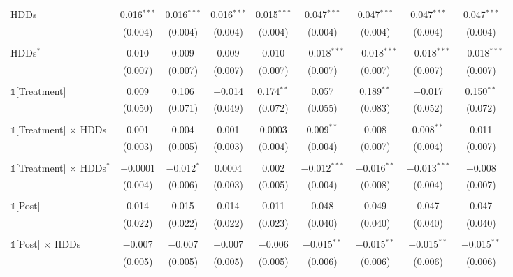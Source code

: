 \begin{table}[t!]
\begin{ThreePartTable}
\begin{landscape}
\begin{longtable}{@{\extracolsep{1.5pt}}lcccccccc}
                HDDs & 0.016$^{***}$ & 0.016$^{***}$ & 0.016$^{***}$ & 0.015$^{***}$ & 0.047$^{***}$ & 0.047$^{***}$ & 0.047$^{***}$ & 0.047$^{***}$ \\
                & (0.004) & (0.004) & (0.004) & (0.004) & (0.004) & (0.004) & (0.004) & (0.004) \\
                & & & & & & & & \\
                HDDs$^{*}$ & 0.010 & 0.009 & 0.009 & 0.010 & $-$0.018$^{***}$ & $-$0.018$^{***}$ & $-$0.018$^{***}$ & $-$0.018$^{***}$ \\
                & (0.007) & (0.007) & (0.007) & (0.007) & (0.007) & (0.007) & (0.007) & (0.007) \\
                & & & & & & & & \\
                $\mathbb{1}$[Treatment] & 0.009 & 0.106 & $-$0.014 & 0.174$^{**}$ & 0.057 & 0.189$^{**}$ & $-$0.017 & 0.150$^{**}$ \\
                & (0.050) & (0.071) & (0.049) & (0.072) & (0.055) & (0.083) & (0.052) & (0.072) \\
                & & & & & & & & \\
                $\mathbb{1}$[Treatment] $\times$ HDDs & 0.001 & 0.004 & 0.001 & 0.0003 & 0.009$^{**}$ & 0.008 & 0.008$^{**}$ & 0.011 \\
                & (0.003) & (0.005) & (0.003) & (0.004) & (0.004) & (0.007) & (0.004) & (0.007) \\
                & & & & & & & & \\
                $\mathbb{1}$[Treatment] $\times$ HDDs$^{*}$ & $-$0.0001 & $-$0.012$^{*}$ & 0.0004 & 0.002 & $-$0.012$^{***}$ & $-$0.016$^{**}$ & $-$0.013$^{***}$ & $-$0.008 \\
                & (0.004) & (0.006) & (0.003) & (0.005) & (0.004) & (0.008) & (0.004) & (0.007) \\
                & & & & & & & & \\
                $\mathbb{1}$[Post] & 0.014 & 0.015 & 0.014 & 0.011 & 0.048 & 0.049 & 0.047 & 0.047 \\
                & (0.022) & (0.022) & (0.022) & (0.023) & (0.040) & (0.040) & (0.040) & (0.040) \\
                & & & & & & & & \\
                $\mathbb{1}$[Post] $\times$ HDDs & $-$0.007 & $-$0.007 & $-$0.007 & $-$0.006 & $-$0.015$^{**}$ & $-$0.015$^{**}$ & $-$0.015$^{**}$ & $-$0.015$^{**}$ \\
                & (0.005) & (0.005) & (0.005) & (0.005) & (0.006) & (0.006) & (0.006) & (0.006) \\

\end{longtable}
\end{landscape}
\end{ThreePartTable}
\end{table}

